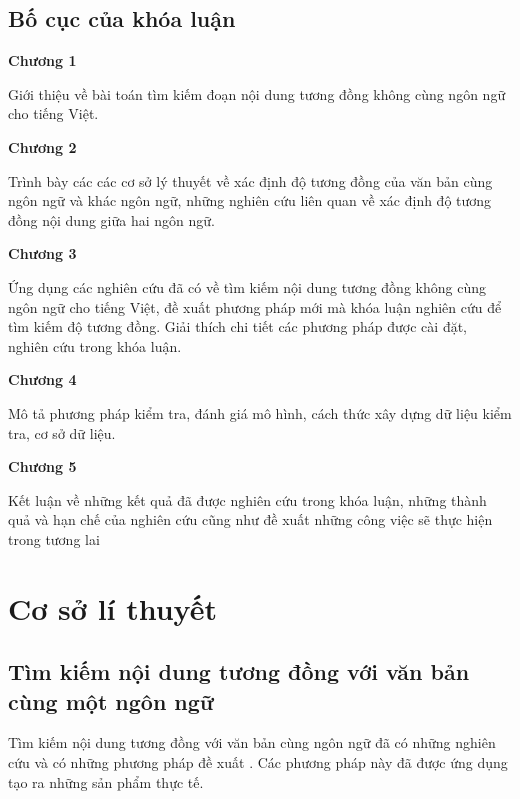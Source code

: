 \documentclass[12pt]{report}
\begin{document}
\section{Bố cục của khóa luận}
\begin{flushleft}
\textbf{Chương 1}

\hspace{10mm} Giới thiệu về bài toán tìm kiếm đoạn nội dung tương đồng không cùng ngôn ngữ cho tiếng Việt.


\textbf{Chương 2}

\hspace{10mm} Trình bày các các cơ sở lý thuyết về xác định độ tương đồng của văn bản cùng ngôn ngữ và khác ngôn ngữ, những nghiên cứu liên quan về xác định độ tương đồng nội dung giữa hai ngôn ngữ.
		

\textbf{Chương 3}

\hspace{10mm}  Ứng dụng các nghiên cứu đã có về tìm kiếm nội dung tương đồng không cùng ngôn ngữ cho tiếng Việt, đề xuất phương pháp mới mà khóa luận nghiên cứu để tìm kiếm độ tương đồng. Giải thích chi tiết các phương pháp được cài đặt, nghiên cứu trong khóa luận.

\textbf{Chương 4}

\hspace{10mm} Mô tả phương pháp kiểm tra, đánh giá mô hình, cách thức xây dựng dữ liệu kiểm tra, cơ sở dữ liệu. 

\textbf{Chương 5}

\hspace{10mm} Kết luận về những kết quả đã được nghiên cứu trong khóa luận, những thành quả và hạn chế của nghiên cứu cũng như đề xuất những công việc sẽ thực hiện trong tương lai
\end{flushleft}



\newpage	
\chapter{Cơ sở lí thuyết}
\label{chap:background}
\section{Tìm kiếm nội dung tương đồng với văn bản cùng một ngôn ngữ}
Tìm kiếm nội  dung tương đồng với văn bản cùng ngôn ngữ đã có những nghiên cứu và có những phương pháp đề xuất \cite{cia-understand}. Các phương pháp này đã được ứng dụng tạo ra những sản phẩm thực tế.
\end{document}
